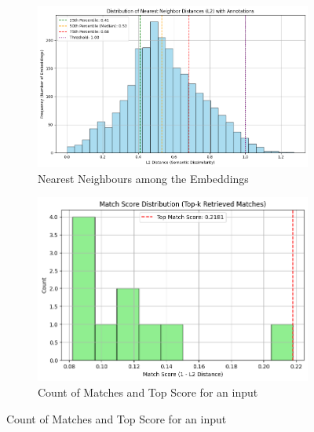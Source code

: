 \begin{figure}[H]
    \centering
    
    \begin{subfigure}[b]{0.496\textwidth}
        \centering
        \includegraphics[width=\textwidth]{Images/RAG_NEAR.png}
        \caption*{Nearest Neighbours among the Embeddings}
        \label{fig:wellbeing_result}
    \end{subfigure}
    \hfill
    \begin{subfigure}[b]{0.496\textwidth}
        \centering
        \includegraphics[width=\textwidth]{Images/RAG_MATCHSCORE.png}
        \caption*{Count of Matches and Top Score for an input}
        \label{fig:wellbeing_questions}
    \end{subfigure}
   
    \label{fig:wellbeing_comparison}
\end{figure}


